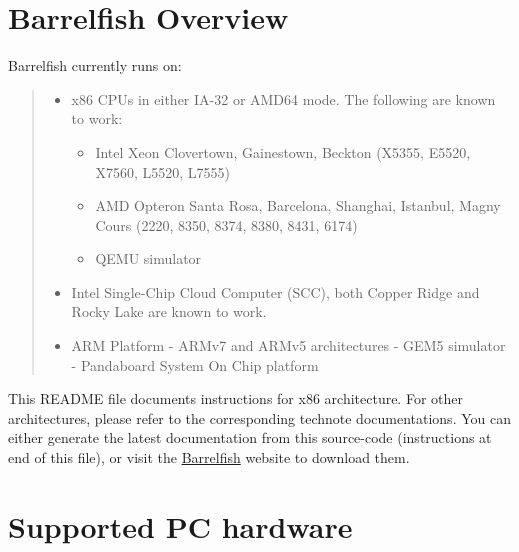 \section{Barrelfish Overview%
  \label{barrelfish-overview}%
}

Barrelfish currently runs on:
%
\begin{quote}
%
\begin{itemize}

\item x86 CPUs in either IA-32 or AMD64 mode. The following are known to work:
%
\begin{itemize}

\item Intel Xeon Clovertown, Gainestown, Beckton (X5355, E5520, X7560, L5520,
L7555)

\item AMD Opteron Santa Rosa, Barcelona, Shanghai, Istanbul, Magny Cours
(2220, 8350, 8374, 8380, 8431, 6174)

\item QEMU simulator

\end{itemize}

\item Intel Single-Chip Cloud Computer (SCC), both Copper Ridge and Rocky Lake
are known to work.

\item ARM Platform
- ARMv7 and ARMv5 architectures
- GEM5 simulator
- Pandaboard System On Chip platform

\end{itemize}

\end{quote}

This README file documents instructions for x86 architecture.  For other
architectures, please refer to the corresponding technote documentations.
You can either generate the latest documentation from this source-code
(instructions at end of this file), or visit the \href{http://www.barrelfish.org/}{Barrelfish} website
to download them.


\section{Supported PC hardware%
  \label{supported-pc-hardware}%
}

